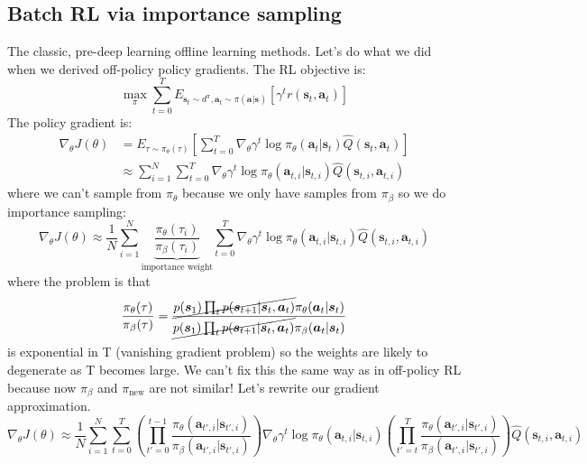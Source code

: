 \documentclass{report}
\begin{document}
\subsection{Batch RL via importance sampling}
The classic, pre-deep learning offline learning methods.
Let's do what we did when we derived off-policy policy gradients.
The RL objective is:
\begin{equation}
		\max_{\pi} \sum_{t=0}^{T} E_{\bm{s}_{t}\sim d^{\pi}, \bm{a}_{t}\sim \pi (\bm{a}_{}|\bm{s}_{})}
		\left[ \gamma^{t} r (\bm{s}_{t}, \bm{a}_{t} ) \right] 
\end{equation}
The policy gradient is:
\begin{align}
		\nabla_{\theta} J(\theta) &= E_{\tau \sim \pi_{\theta}(\tau)}
\left[ \sum_{t=0}^{T} \nabla_{\theta} \gamma^{t} \log \pi_{\theta} (\bm{a}_{t}| \bm{s}_{t} ) \hat{Q} (\bm{s}_{t}, \bm{a}_{t} ) \right]  \\
  &\approx \sum_{i=1}^{N} \sum_{t=0}^{T} \nabla_{\theta} \gamma^{t} \log \pi_{\theta} (\bm{a}_{t,i}| \bm{s}_{t,i} )
  \hat{Q} (\bm{s}_{t,i}, \bm{a}_{t,i} )
\end{align}
where we can't sample from $ \pi_{\theta}  $ because we only
have samples from $ \pi_{\beta}  $ so we do importance sampling:
\begin{equation}
\nabla_{\theta} J(\theta) \approx 
\frac{1}{N} \sum_{i=1}^{N} 
\underbrace{\frac{\pi_{\theta}(\tau_i)}{\pi_\beta(\tau_i)} }_{\text{importance weight}}
\sum_{t=0}^{T} 
\nabla_{\theta} \gamma^t \log \pi_\theta (\bm{a}_{t,i}| \bm{s}_{t,i} ) \hat{Q} (\bm{s}_{t,i}, \bm{a}_{t,i} )
\end{equation}
where the problem is that
\begin{equation}
		\frac{\pi_\theta(\tau)}{\pi_\beta(\tau)} =
		\frac{\cancel{p(\bm{s}_{1}) \prod_{t}^{} p(\bm{s}_{t+1}| \bm{s}_{t}, \bm{a}_{t})} \pi_\theta (\bm{a}_{t}| \bm{s}_{t} ) }
		{\cancel{p(\bm{s}_{1}) \prod_{t}^{} p(\bm{s}_{t+1}| \bm{s}_{t}, \bm{a}_{t})} \pi_\beta (\bm{a}_{t}| \bm{s}_{t} ) } 	
\end{equation}
is exponential in T (vanishing gradient problem)
so the weights are likely to degenerate as T becomes large.
We can't fix this the same way as in off-policy RL because now $\pi_{ \beta }$ and $\pi_{ \text{new} }$ are not similar!
Let's rewrite our gradient approximation.
\begin{equation}
\nabla_{ \theta } J (\theta) \approx \frac{1}{N} \sum_{i=1}^{N} \sum_{t=0}^{T} 
\left( \prod_{t'=0}^{t-1} \frac{\pi_{ \theta } (\bm{a}_{t',i}|\bm{s}_{t',i})}{\pi_{ \beta } (\bm{a}_{t',i}|\bm{s}_{t',i})}   \right) 
\nabla_{ \theta } \gamma^{ t }  \log \pi_{ \theta } (\bm{a}_{t,i}| \bm{s}_{t,i} )
\left( \prod_{t'=t}^{T} \frac{\pi_{ \theta } (\bm{a}_{t',i}| \bm{s}_{t',i} )}{\pi_{ \beta }(\bm{a}_{t',i}| \bm{s}_{t',i} )}   \right)
\hat{Q} (\bm{s}_{t,i}, \bm{a}_{t,i} )
\end{equation}
\end{document}
